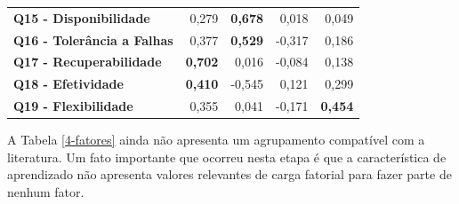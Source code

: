 \begin{apendicesenv}
\begin{longtable}{rrrrr}
    \multicolumn{1}{l}{\textbf{Q15 - Disponibilidade}} & 0,279  & \textbf{0,678} & 0,018  & 0,049 \\
    \multicolumn{1}{l}{\textbf{Q16 - Tolerância a Falhas}} & 0,377  & \textbf{0,529} & -0,317 & 0,186 \\
    \multicolumn{1}{l}{\textbf{Q17 - Recuperabilidade}} & \textbf{0,702} & 0,016  & -0,084 & 0,138 \\
    \multicolumn{1}{l}{\textbf{Q18 - Efetividade}} & \textbf{0,410} & -0,545 & 0,121  & 0,299 \\
    \multicolumn{1}{l}{\textbf{Q19 - Flexibilidade}} & 0,355  & 0,041  & -0,171 & \textbf{0,454} \\
    \hline
    \end{longtable}%
    
A Tabela \ref{4-fatores} ainda não apresenta um agrupamento compatível com a literatura. Um fato importante que ocorreu nesta etapa é que a característica de aprendizado não apresenta valores relevantes de carga fatorial para fazer parte de nenhum fator.  



\end{apendicesenv}
